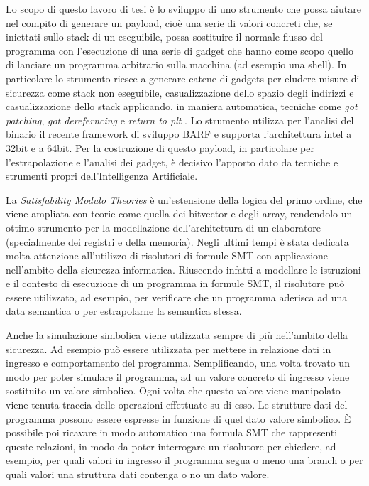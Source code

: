 Lo scopo di questo lavoro di tesi è lo sviluppo di uno strumento che
possa aiutare nel compito di generare un payload, cioè una serie di
valori concreti che, se iniettati sullo stack di un eseguibile, possa
sostituire il normale flusso del programma con l'esecuzione di una
serie di gadget che hanno come scopo quello di lanciare un programma
arbitrario sulla macchina (ad esempio una shell). In particolare lo
strumento riesce a generare catene di gadgets per eludere misure di
sicurezza come stack non eseguibile, casualizzazione dello spazio
degli indirizzi e casualizzazione dello stack applicando, in maniera
automatica, tecniche come \emph{got patching}, \emph{got dereferncing}
e \emph{return to plt} \cite{roglia:2009}. Lo strumento utilizza per
l'analisi del binario il recente framework di sviluppo BARF
\cite{Heitman-14} e supporta l'architettura intel a 32bit e a
64bit. Per la costruzione di questo payload, in particolare per
l'estrapolazione e l'analisi dei gadget, è decisivo l'apporto dato da
tecniche e strumenti propri dell'Intelligenza Artificiale.

La \emph{Satisfability Modulo Theories}\cite{Barrett-14} è
un'estensione della logica del primo ordine, che viene ampliata con
teorie come quella dei bitvector e degli array, rendendolo un ottimo
strumento per la modellazione dell'architettura di un elaboratore
(specialmente dei registri e della memoria). Negli ultimi tempi è
stata dedicata molta attenzione all'utilizzo di risolutori di formule
SMT con applicazione nell'ambito della sicurezza
informatica\cite{Vanegue:2012}. Riuscendo infatti a modellare le
istruzioni e il contesto di esecuzione di un programma in formule SMT,
il risolutore può essere utilizzato, ad esempio, per verificare che un
programma aderisca ad una data semantica o per estrapolarne la
semantica stessa.

Anche la simulazione simbolica viene utilizzata sempre di più
nell'ambito della sicurezza. Ad esempio può essere utilizzata per
mettere in relazione dati in ingresso e comportamento del
programma. Semplificando, una volta trovato un modo per poter simulare
il programma, ad un valore concreto di ingresso viene sostituito un
valore simbolico. Ogni volta che questo valore viene manipolato viene
tenuta traccia delle operazioni effettuate su di esso. Le strutture
dati del programma possono essere espresse in funzione di quel dato
valore simbolico. È possibile poi ricavare in modo automatico una
formula SMT che rappresenti queste relazioni, in modo da poter
interrogare un risolutore per chiedere, ad esempio, per quali valori
in ingresso il programma segua o meno una branch o per quali valori
una struttura dati contenga o no un dato valore.

